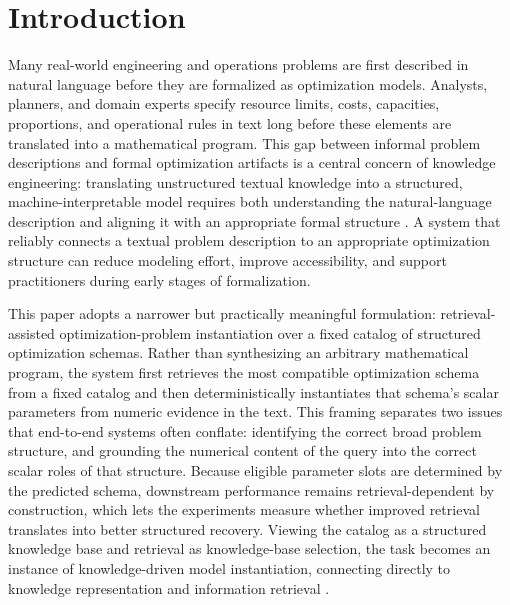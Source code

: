 \documentclass[3p]{elsarticle}
\begin{document}
\section{Introduction}

Many real-world engineering and operations problems are first described in natural language before they are formalized as optimization models. Analysts, planners, and domain experts specify resource limits, costs, capacities, proportions, and operational rules in text long before these elements are translated into a mathematical program. This gap between informal problem descriptions and formal optimization artifacts is a central concern of knowledge engineering: translating unstructured textual knowledge into a structured, machine-interpretable model requires both understanding the natural-language description and aligning it with an appropriate formal structure \cite{affolter2019nli,ramamonjison2022autoformulation,ramamonjison2023nl4opt}. A system that reliably connects a textual problem description to an appropriate optimization structure can reduce modeling effort, improve accessibility, and support practitioners during early stages of formalization.

This paper adopts a narrower but practically meaningful formulation: retrieval-assisted optimization-problem instantiation over a fixed catalog of structured optimization schemas. Rather than synthesizing an arbitrary mathematical program, the system first retrieves the most compatible optimization schema from a fixed catalog and then deterministically instantiates that schema's scalar parameters from numeric evidence in the text. This framing separates two issues that end-to-end systems often conflate: identifying the correct broad problem structure, and grounding the numerical content of the query into the correct scalar roles of that structure. Because eligible parameter slots are determined by the predicted schema, downstream performance remains retrieval-dependent by construction, which lets the experiments measure whether improved retrieval translates into better structured recovery. Viewing the catalog as a structured knowledge base and retrieval as knowledge-base selection, the task becomes an instance of knowledge-driven model instantiation, connecting directly to knowledge representation and information retrieval \cite{nlp4lp_dataset,ahmaditeshnizi2024optimus_icml,sheetrit2024rematch}.
\end{document}
